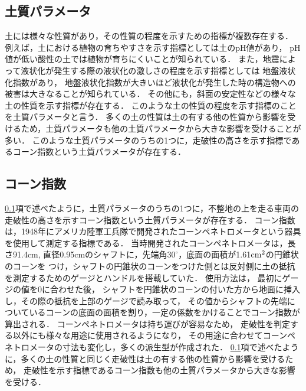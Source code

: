 \subsection{土質パラメータ}
\label{ssec:SoilParameters}

土には様々な性質があり，その性質の程度を示すための指標が複数存在する．
例えば，土における植物の育ちやすさを示す指標としては土のpH値があり，
pH値が低い酸性の土では植物が育ちにくいことが知られている\cite{三枝1991}\cite{図子1993}．
また，地震によって液状化が発生する際の液状化の激しさの程度を示す指標としては
地盤液状化指数があり，
地盤液状化指数が大きいほど液状化が発生した時の構造物への被害は大きなることが知られている\cite{龍岡1980}\cite{岩崎1980}\cite{浜田1986}．
その他にも，斜面の安定性などの様々な土の性質を示す指標が存在する\cite{三笠1964}．
このような土の性質の程度を示す指標のことを土質パラメータと言う\cite{山口1986}\cite{渡部2007}．
多くの土の性質は土の有する他の性質から影響を受けるため，土質パラメータも他の土質パラメータから大きな影響を受けることが多い\cite{太田1988}\cite{三隅1992}．
このような土質パラメータのうちの1つに，走破性の高さを示す指標であるコーン指数という土質パラメータが存在する．

\subsection{コーン指数}
\label{ssec:Coneindex}

\ref{ssec:SoilParameters}項で述べたように，土質パラメータのうちの1つに，不整地の上を走る車両の走破性の高さを示すコーン指数という土質パラメータが存在する．
コーン指数は，1948年にアメリカ陸軍工兵隊で開発されたコーンペネトロメータという器具を使用して測定する指標である\cite{WES1948}\cite{Perumpral1987}．
当時開発されたコーンペネトロメータは，長さ91.4cm, 直径0.95cmのシャフトに，先端角$30^\circ$，底面の面積が1.61$\rm cm^2$の円錐状のコーンを
つけ，シャフトの円錐状のコーンをつけた側とは反対側に土の抵抗を測定するためのゲージとハンドルを搭載していた．
使用方法は，
最初にゲージの値を0に合わせた後，
シャフトを円錐状のコーンの付いた方から地面に挿入し，その際の抵抗を上部のゲージで読み取って，
その値からシャフトの先端についているコーンの底面の面積を割り，一定の係数をかけることでコーン指数が算出される．
コーンペネトロメータは持ち運びが容易なため，
走破性を判定する以外にも様々な用途に使用されるようになり，
その用途に合わせてコーンペネトロメータの寸法も変化し，多くの派生型が作成された\cite{Hendrick1969}\cite{Prather1970}．
\ref{ssec:SoilParameters}項で述べたように，多くの土の性質と同じく走破性は土の有する他の性質から影響を受けるため，
走破性を示す指標であるコーン指数も他の土質パラメータから大きな影響を受ける．

